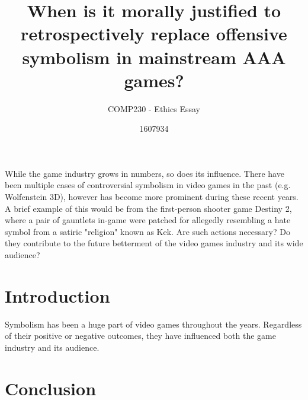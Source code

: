 \documentclass{scrartcl}
\title{When is it morally justified to retrospectively replace offensive symbolism in mainstream AAA games?}
\subtitle{COMP230 - Ethics Essay}
\author{1607934}
\begin{document}
\maketitle

\abstract{} 
While the game industry grows in numbers, so does its influence. There have been multiple cases of controversial symbolism in video games in the past (e.g. Wolfenstein 3D), however has become more prominent during these recent years. A brief example of this would be from the first-person shooter game Destiny 2, where a pair of gauntlets in-game were patched for allegedly resembling a hate symbol from a satiric "religion" known as Kek. Are such actions necessary? Do they contribute to the future betterment of the video games industry and its wide audience?

\section{Introduction}
Symbolism has been a huge part of video games throughout the years. Regardless of their positive or negative outcomes, they have influenced both the game industry and its audience.


\section{}



\section{}



\section{}



\section{Conclusion}





\end{document}
